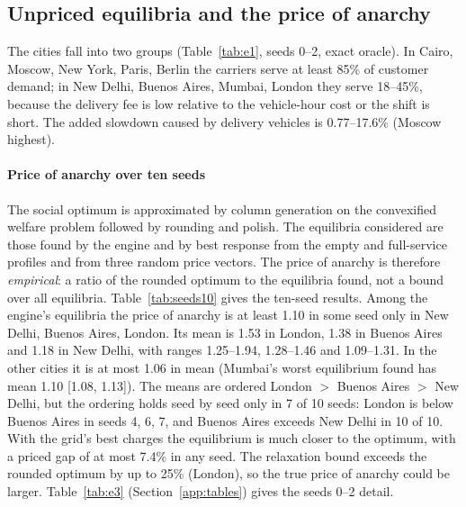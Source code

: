 \documentclass[preprint,11pt]{elsarticle}
\theoremstyle{definition}
\theoremstyle{remark}
\begin{document}
\subsection{Unpriced equilibria and the price of anarchy}\label{sec:res-eq}\label{sec:res-poa}

The cities fall into two groups (Table~\ref{tab:e1}, seeds 0--2, exact oracle). In Cairo, Moscow, New York, Paris, Berlin the carriers serve at least 85\% of customer demand; in New Delhi, Buenos Aires, Mumbai, London they serve 18--45\%, because the delivery fee is low relative to the vehicle-hour cost or the shift is short. The added slowdown caused by delivery vehicles is 0.77--17.6\% (Moscow highest).

\paragraph{Price of anarchy over ten seeds} The social optimum is approximated by column generation on the convexified welfare problem followed by rounding and polish. The equilibria considered are those found by the engine and by best response from the empty and full-service profiles and from three random price vectors. The price of anarchy is therefore \emph{empirical}: a ratio of the rounded optimum to the equilibria found, not a bound over all equilibria. Table~\ref{tab:seeds10} gives the ten-seed results. Among the engine's equilibria the price of anarchy is at least 1.10 in some seed only in New Delhi, Buenos Aires, London. Its mean is 1.53 in London, 1.38 in Buenos Aires and 1.18 in New Delhi, with ranges 1.25--1.94, 1.28--1.46 and 1.09--1.31. In the other cities it is at most 1.06 in mean (Mumbai's worst equilibrium found has mean 1.10 [1.08, 1.13]). The means are ordered London $>$ Buenos Aires $>$ New Delhi, but the ordering holds seed by seed only in 7 of 10 seeds: London is below Buenos Aires in seeds 4, 6, 7, and Buenos Aires exceeds New Delhi in 10 of 10. With the grid's best charges the equilibrium is much closer to the optimum, with a priced gap of at most 7.4\% in any seed. The relaxation bound exceeds the rounded optimum by up to 25\% (London), so the true price of anarchy could be larger. Table~\ref{tab:e3} (Section~\ref{app:tables}) gives the seeds 0--2 detail.
\end{document}
